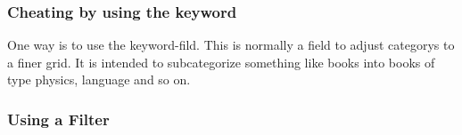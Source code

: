 \documentclass{article}
\begin{document}
\subsubsection{Cheating by using the keyword}
One way is to use the keyword-fild. This is normally a field to adjust categorys to a finer grid. It is intended to subcategorize something like books into books of type physics, language and so on. 
\printbibliography[keyword=elec, title={Only electronics}]

\subsubsection{Using a Filter}
\printbibliography[filter=electronics]
\end{document}
